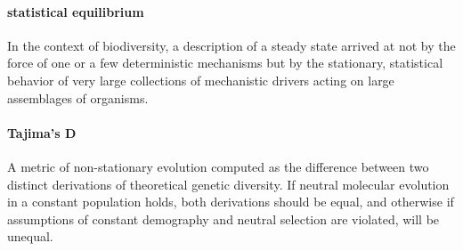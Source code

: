 \documentclass[12pt]{article}
\begin{document}
\paragraph{statistical equilibrium} In the context of biodiversity, a
description of a steady state arrived at not by the force of one or a
few deterministic mechanisms but by the stationary, statistical
behavior of very large collections of mechanistic drivers acting on
large assemblages of organisms.

\paragraph{Tajima's D} A metric of non-stationary evolution computed
as the difference between two distinct derivations of theoretical
genetic diversity. If neutral molecular evolution in a constant
population holds, both derivations should be equal, and otherwise if
assumptions of constant demography and neutral selection are violated,
will be unequal.


\end{document}

